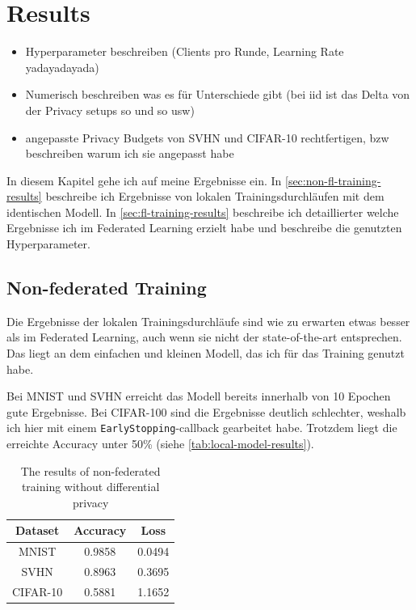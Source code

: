 \chapter{Results}\label{chap:results}
\begin{itemize}
	\item Hyperparameter beschreiben (Clients pro Runde, Learning Rate yadayadayada)
	\item Numerisch beschreiben was es für Unterschiede gibt (bei iid ist das Delta von der Privacy setups so und so usw)
	\item angepasste Privacy Budgets von SVHN und CIFAR-10 rechtfertigen, bzw beschreiben warum ich sie angepasst habe
\end{itemize}

In diesem Kapitel gehe ich auf meine Ergebnisse ein. In \autoref{sec:non-fl-training-results} beschreibe ich Ergebnisse von lokalen Trainingsdurchläufen mit dem identischen Modell. In \autoref{sec:fl-training-results} beschreibe ich detaillierter welche Ergebnisse ich im Federated Learning erzielt habe und beschreibe die genutzten Hyperparameter.

\section{Non-federated Training} \label{sec:non-fl-training-results}
Die Ergebnisse der lokalen Trainingsdurchläufe sind wie zu erwarten etwas besser als im Federated Learning, auch wenn sie nicht der state-of-the-art entsprechen. Das liegt an dem einfachen und kleinen Modell, das ich für das Training genutzt habe.

Bei MNIST und SVHN erreicht das Modell bereits innerhalb von 10 Epochen gute Ergebnisse. Bei CIFAR-100 sind die Ergebnisse deutlich schlechter, weshalb ich hier mit einem \texttt{EarlyStopping}-callback gearbeitet habe. Trotzdem liegt die erreichte Accuracy unter 50\% (siehe \autoref{tab:local-model-results}).

\begin{table}
	\centering
	\begin{tabular}{|c|c|c|}
		\hline
		Dataset & Accuracy & Loss \\
		\hline
		MNIST & 0.9858 & 0.0494 \\
		SVHN & 0.8963 & 0.3695 \\
		CIFAR-10 & 0.5881 & 1.1652 \\
		\hline
	\end{tabular}
	\caption{The results of non-federated training without differential privacy}
	\label{tab:local-model-results}
\end{table}

